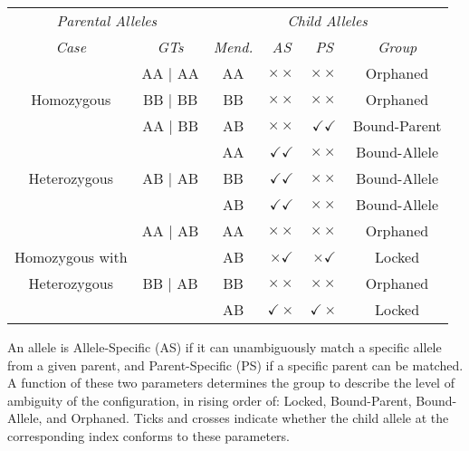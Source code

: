 

\begin{table}[!b]
{\begin{tabular}{| *2c | *4c |} \hline %

  \multicolumn{2}{|c|}{\emph{Parental Alleles}}
& \multicolumn{4}{c|}{\emph{Child Alleles}}  \\


\emph{Case} & \emph{GTs} & \emph{Mend.} & \emph{AS} & \emph{PS} & \emph{Group}\\
\hline
                   & AA | AA &   AA   & $\times\times$         & $\times\times$         & Orphaned \\
Homozygous         & BB | BB &   BB   & $\times\times$         & $\times\times$         & Orphaned \\
                   & AA | BB &   AB   & $\times\times$         & $\checkmark\checkmark$ & Bound-Parent\\
\hline
                   &         &   AA   & $\checkmark\checkmark$ & $\times\times$         & Bound-Allele\\
Heterozygous       & AB | AB &   BB   & $\checkmark\checkmark$ & $\times\times$         & Bound-Allele\\
                   &         &   AB   & $\checkmark\checkmark$ & $\times\times$         & Bound-Allele\\
\hline
                   & AA | AB &   AA   & $\times\times$         & $\times\times$         & Orphaned\\
Homozygous with    &         &   AB   & $\times\checkmark$     & $\times\checkmark$     & Locked\\
   Heterozygous    & BB | AB &   BB   & $\times\times$         & $\times\times$         & Orphaned\\
                   &         &   AB   & $\checkmark\times$     & $\checkmark\times$     & Locked\\
\hline
\end{tabular}}
{An allele is Allele-Specific (AS) if it can unambiguously match a specific allele from a given parent, and Parent-Specific (PS) if a specific parent can be matched. A function of these two parameters determines the group to describe the level of ambiguity of the configuration, in rising order of: Locked, Bound-Parent, Bound-Allele, and Orphaned. Ticks and crosses indicate whether the child allele at the corresponding index conforms to these parameters.}
\end{table}


